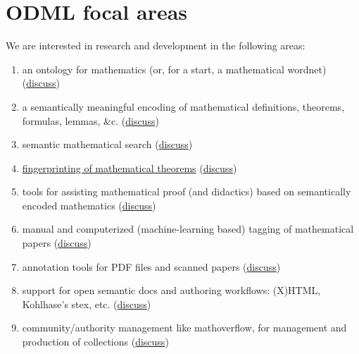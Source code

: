 \documentclass{article}
\begin{document}
\section{ODML focal areas}

We are interested in research and development in the following areas:

\begin{enumerate}
\renewcommand{\theenumi}{\Alph{enumi}}
\item\label{ontology} an ontology for mathematics (or, for a start, a mathematical wordnet) (\href{https://github.com/holtzermann17/skelodml/wiki/A.-An-ontology-for-mathematics}{discuss})
\item\label{encoding} a semantically meaningful encoding of mathematical definitions, theorems, formulas, lemmas, \&c. (\href{https://github.com/holtzermann17/skelodml/wiki/B.-Semantically-meaningful-encodings-of-mathematical-objects}{discuss})
\item\label{search} semantic mathematical search (\href{https://github.com/holtzermann17/skelodml/wiki/C.-Semantic-mathematical-search}{discuss})
\item\label{fingerprinting} \href{http://www.ams.org/notices/201308/rnoti-p1034.pdf}{fingerprinting of mathematical theorems} (\href{https://github.com/holtzermann17/skelodml/wiki/D.-Fingerprinting-of-mathematical-theorems}{discuss})
\item\label{proof} tools for assisting mathematical proof (and didactics) based on semantically encoded mathematics (\href{https://github.com/holtzermann17/skelodml/wiki/E.-Tools-for-assisting-mathematical-proof}{discuss})
\item\label{tagging} manual and computerized (machine-learning based) tagging of mathematical papers (\href{https://github.com/holtzermann17/skelodml/wiki/F.-(semi)automated-tagging-of-mathematical-papers}{discuss})
\item\label{annotation} annotation tools for PDF files and scanned papers (\href{https://github.com/holtzermann17/skelodml/wiki/G.-annotation-tools-for-PDF-files}{discuss})
\item\label{authoring} support for open semantic docs and authoring workflows: (X)HTML, Kohlhase's stex, etc. (\href{https://github.com/holtzermann17/skelodml/wiki/H.-Open-semantic-docs-and-authoring-workflows}{discuss})
\item\label{community} community/authority management like mathoverflow, for management and production of collections (\href{https://github.com/holtzermann17/skelodml/wiki/I.-community-and-authority-management-tools}{discuss})

\end{enumerate}
\end{document}
